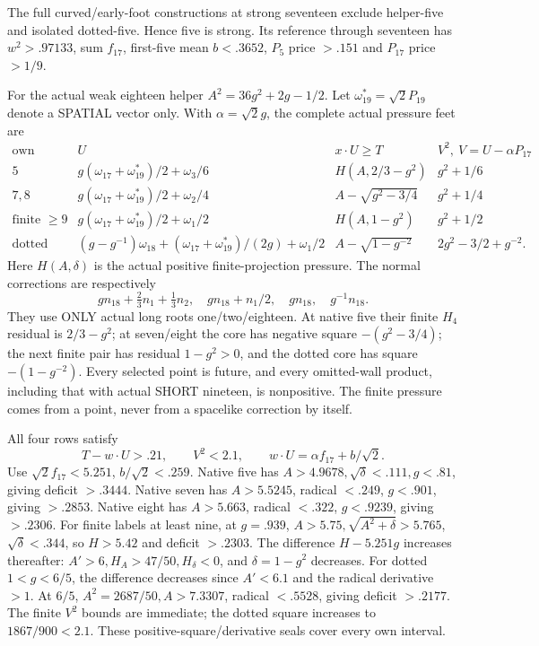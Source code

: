 The full curved/early-foot
constructions at strong seventeen
exclude helper-five and isolated
dotted-five.
Hence five is strong.
Its reference through seventeen
has
\(w^2>.97133\), sum \(f_{17}\),
first-five mean \(b<.3652\),
\(P_5\) price \(>.151\) and
\(P_{17}\) price \(>1/9\).

For the actual weak eighteen
helper \(A^2=36g^2+2g-1/2\).
Let \(\omega_{19}^*=\sqrt2P_{19}\)
denote a SPATIAL vector only.
With \(\alpha=\sqrt2g\), the
complete actual pressure feet
are
\[
\begin{array}{c|c|c|c}
 \text{own}&U&x\cdot U\ge T&V^2,\ V=U-\alpha P_{17}\\ \hline
 5&g(\omega_{17}+\omega_{19}^*)/2+\omega_3/6&
          H(A,2/3-g^2)&g^2+1/6\\
 7,8&g(\omega_{17}+\omega_{19}^*)/2+\omega_2/4&
          A-\sqrt{g^2-3/4}&g^2+1/4\\
 \text{finite }\ge9&
       g(\omega_{17}+\omega_{19}^*)/2+\omega_1/2&
          H(A,1-g^2)&g^2+1/2\\
 \text{dotted}&
       (g-g^{-1})\omega_{18}
          +(\omega_{17}+\omega_{19}^*)/(2g)+\omega_1/2&
          A-\sqrt{1-g^{-2}}&2g^2-3/2+g^{-2}.
\end{array}
\]
Here \(H(A,\delta)\) is the actual
positive finite-projection pressure.
The normal corrections are respectively
\[
 g n_{18}+\tfrac23n_1+\tfrac13n_2,\quad
 g n_{18}+n_1/2,\quad
 g n_{18},\quad
 g^{-1}n_{18}.
\]
They use ONLY actual long roots
one/two/eighteen.
At native five their finite
\(H_4\) residual is \(2/3-g^2\);
at seven/eight the core has
negative square \(-(g^2-3/4)\);
the next finite pair has residual
\(1-g^2>0\), and the dotted core
has square \(-(1-g^{-2})\).
Every selected point is future,
and every omitted-wall product,
including that with actual SHORT
nineteen, is nonpositive.
The finite pressure comes from
a point, never from a spacelike
correction by itself.

All four rows satisfy
\[
          T-w\cdot U>.21,\qquad V^2<2.1,\qquad
                w\cdot U=\alpha f_{17}+b/\sqrt2 .
\tag{B19helper18}\label{app:exact19:eq:Bhelper18}
\]
Use \(\sqrt2f_{17}<5.251\),
\(b/\sqrt2<.259\).
Native five has
\(A>4.9678,\sqrt\delta<.111,g<.81\),
giving deficit \(>.3444\).
Native seven has
\(A>5.5245\), radical \(<.249\),
\(g<.901\), giving \(>.2853\).
Native eight has
\(A>5.663\), radical \(<.322\),
\(g<.9239\), giving \(>.2306\).
For finite labels at least nine,
at \(g=.939\),
\(A>5.75,\sqrt{A^2+\delta}>5.765\),
\(\sqrt\delta<.344\), so
\(H>5.42\) and deficit \(>.2303\).
The difference \(H-5.251g\)
increases thereafter:
\(A'>6,H_A>47/50,H_\delta<0\),
and \(\delta=1-g^2\) decreases.
For dotted \(1<g<6/5\),
the difference decreases since
\(A'<6.1\) and the radical
derivative \(>1\).
At \(6/5\),
\(A^2=2687/50,A>7.3307\),
radical \(<.5528\), giving
deficit \(>.2177\).
The finite \(V^2\) bounds are
immediate; the dotted square
increases to \(1867/900<2.1\).
These positive-square/derivative
seals cover every own interval.

